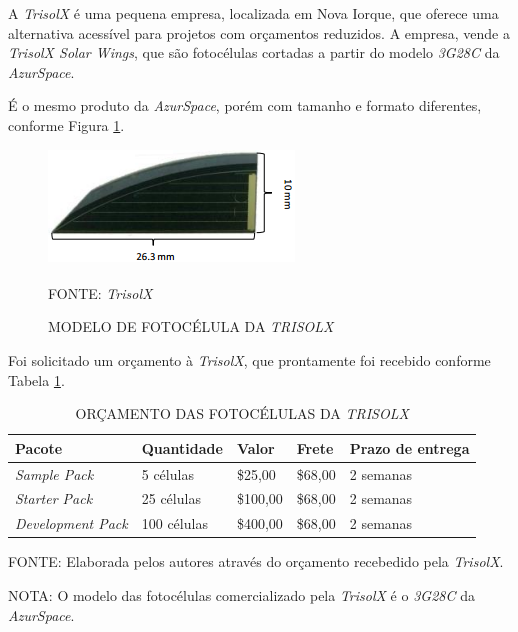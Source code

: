 \documentclass[
	12pt,				%
	openright,			%
	oneside,			%
	a4paper,			%
	english,			%
	french,				%
	spanish,			%
	brazil,				%
	oldfontcommands
	]{abntex2}
\begin{document}
	A \textit{TrisolX} é uma pequena empresa, localizada em Nova Iorque, que oferece uma alternativa acessível para projetos com orçamentos reduzidos. A empresa, vende a \textit{TrisolX Solar Wings}, que são fotocélulas cortadas a partir do modelo \textit{3G28C} da \textit{AzurSpace}.
	
	É o mesmo produto da \textit{AzurSpace}, porém com tamanho e formato diferentes, conforme Figura \ref{Fig_Cell_TrisolX}.
	
	\begin{figure}[th]
		\caption{MODELO DE FOTOCÉLULA DA \textit{TRISOLX}}
		\label{Fig_Cell_TrisolX}
		\centering
		\includegraphics[width=0.5\linewidth]{./figs/TrisolX}
			
		\begin{small}
			FONTE: \textit{TrisolX}\textsuperscript{\cite{TrisolX}}
		\end{small}		
	\end{figure}	

	Foi solicitado um orçamento à \textit{TrisolX}, que prontamente foi recebido conforme Tabela \ref{Tab_Orc_TrisolX}.
	
	\begin{table}[th]
	\caption{ORÇAMENTO DAS FOTOCÉLULAS DA \textit{TRISOLX}}
	\label{Tab_Orc_TrisolX}
	\centering
	\begin{tabular}{p{3.5cm}|p{2.5cm}|p{1.5cm}|p{1.5cm}|p{2.0cm}}
		\textbf{Pacote} & \textbf{Quantidade} & \textbf{Valor} & \textbf{Frete} & \textbf{Prazo de entrega}\\
		\hline
		\textit{Sample Pack} & 5 células & \$25,00 &  \$68,00 & 2 semanas\\
		\textit{Starter Pack} & 25 células & \$100,00 &  \$68,00 & 2 semanas\\
		\textit{Development Pack} & 100 células & \$400,00 & \$68,00 & 2 semanas\\
	\end{tabular}
	
	\begin{small}
	\vspace{3pt}
		FONTE: Elaborada pelos autores através do orçamento recebedido pela \textit{TrisolX}.
	\end{small}
	
	\begin{footnotesize}
		NOTA: O modelo das fotocélulas comercializado pela \textit{TrisolX} é o \textit{3G28C} da \textit{AzurSpace}.
	\end{footnotesize}
	\end{table}	
	
\end{document}
